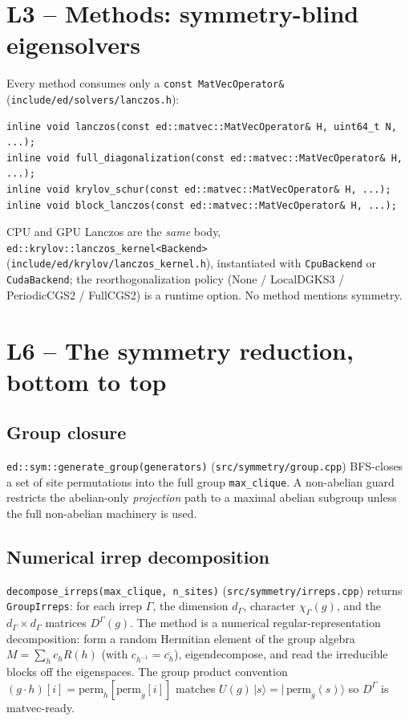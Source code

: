 \documentclass[11pt]{article}
\newcommand{\code}[1]{\texttt{\small #1}}
\newcommand{\file}[1]{\texttt{\footnotesize #1}}
\begin{document}
\section{L3 -- Methods: symmetry-blind eigensolvers}

Every method consumes only a \code{const MatVecOperator\&}
(\file{include/ed/solvers/lanczos.h}):
\begin{lstlisting}
inline void lanczos(const ed::matvec::MatVecOperator& H, uint64_t N, ...);
inline void full_diagonalization(const ed::matvec::MatVecOperator& H, ...);
inline void krylov_schur(const ed::matvec::MatVecOperator& H, ...);
inline void block_lanczos(const ed::matvec::MatVecOperator& H, ...);
\end{lstlisting}
CPU and GPU Lanczos are the \emph{same} body,
\code{ed::krylov::lanczos\_kernel<Backend>}
(\file{include/ed/krylov/lanczos\_kernel.h}), instantiated with
\code{CpuBackend} or \code{CudaBackend}; the reorthogonalization policy
(None / LocalDGKS3 / PeriodicCGS2 / FullCGS2) is a runtime option. No
method mentions symmetry.

\section{L6 -- The symmetry reduction, bottom to top}

\subsection{Group closure}
\code{ed::sym::generate\_group(generators)} (\file{src/symmetry/group.cpp})
BFS-closes a set of site permutations into the full group
\code{max\_clique}. A non-abelian guard restricts the abelian-only
\emph{projection} path to a maximal abelian subgroup unless the full
non-abelian machinery is used.

\subsection{Numerical irrep decomposition}
\code{decompose\_irreps(max\_clique, n\_sites)}
(\file{src/symmetry/irreps.cpp}) returns \code{GroupIrreps}: for each
irrep $\Gamma$, the dimension $d_\Gamma$, character $\chi_\Gamma(g)$, and
the $d_\Gamma\!\times\!d_\Gamma$ matrices $D^\Gamma(g)$. The method is a
numerical regular-representation decomposition: form a random Hermitian
element of the group algebra $M=\sum_h c_h R(h)$ (with
$c_{h^{-1}}=\overline{c_h}$), eigendecompose, and read the irreducible
blocks off the eigenspaces. The group product convention
$(g\!\cdot\!h)[i]=\text{perm}_h[\text{perm}_g[i]]$ matches
$U(g)\,|s\rangle = |\,\text{perm}_g(s)\rangle$ so $D^\Gamma$ is matvec-ready.
\end{document}
